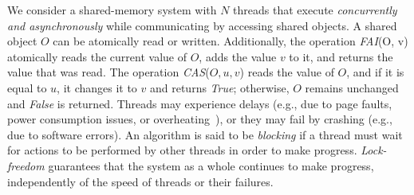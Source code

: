 \documentclass[a4paper,11pt,twoside,openany]{book}
\newcommand{\CAS}{\mbox{\textit{CAS}}}
\newcommand{\FAI}{\mbox{\textit{FAI}}}
\begin{document}
We consider a shared-memory system with \( N \) threads that execute {\em concurrently
and asynchronously} while communicating by accessing shared objects. A shared object
\( O \) can be atomically read or written. Additionally, the operation \FAI(O, v)
atomically reads the current value of \( O \), adds the value \( v \) to it, and
returns the value that was read. The operation \CAS($O, u, v$) reads the value of
\( O \), and if it is equal to \( u \), it changes it to \( v \) and returns
\textit{True}; otherwise, \( O \) remains unchanged and \textit{False} is returned.
% 
Threads may experience delays (e.g., due to page faults, power consumption issues,
or overheating~\cite{inteloverheating}), or they may fail by crashing (e.g., due to
software errors). An algorithm is said to be {\em blocking} if a thread must wait for
actions to be performed by other threads in order to make progress. {\em Lock-freedom}
guarantees that the system as a whole continues to make progress, independently of the
speed of threads or their failures.
\end{document}
